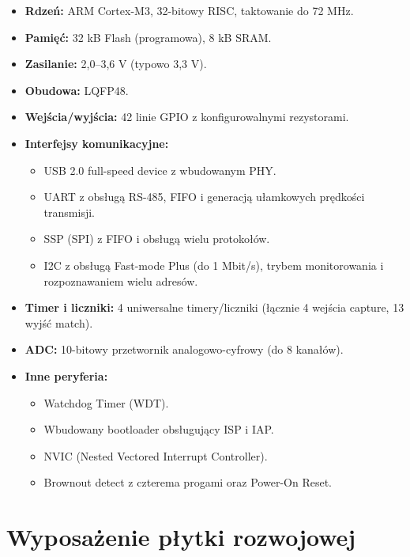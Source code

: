 \documentclass[a4paper,12pt]{report}
\begin{document}
\begin{itemize}
    \item \textbf{Rdzeń:} ARM Cortex-M3, 32-bitowy RISC, taktowanie do 72 MHz.
    \item \textbf{Pamięć:} 32 kB Flash (programowa), 8 kB SRAM.
    \item \textbf{Zasilanie:} 2,0–3,6 V (typowo 3,3 V).
    \item \textbf{Obudowa:} LQFP48.
    \item \textbf{Wejścia/wyjścia:} 42 linie GPIO z konfigurowalnymi rezystorami.
    \item \textbf{Interfejsy komunikacyjne:}
    \begin{itemize}
        \item USB 2.0 full-speed device z wbudowanym PHY.
        \item UART z obsługą RS-485, FIFO i generacją ułamkowych prędkości transmisji.
        \item SSP (SPI) z FIFO i obsługą wielu protokołów.
        \item I2C z obsługą Fast-mode Plus (do 1 Mbit/s), trybem monitorowania i rozpoznawaniem wielu adresów.
    \end{itemize}
    \item \textbf{Timer i liczniki:} 4 uniwersalne timery/liczniki (łącznie 4 wejścia capture, 13 wyjść match).
    \item \textbf{ADC:} 10-bitowy przetwornik analogowo-cyfrowy (do 8 kanałów).
    \item \textbf{Inne peryferia:}
    \begin{itemize}
        \item Watchdog Timer (WDT).
        \item Wbudowany bootloader obsługujący ISP i IAP.
        \item NVIC (Nested Vectored Interrupt Controller).
        \item Brownout detect z czterema progami oraz Power-On Reset.
    \end{itemize}
\end{itemize}

\section{Wyposażenie płytki rozwojowej}
\end{document}
